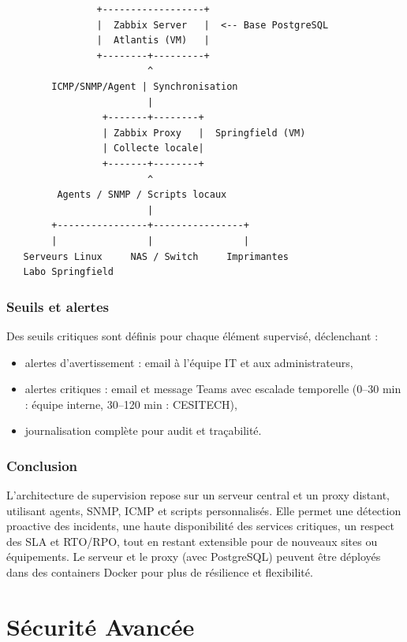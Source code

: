 \vspace{0.5cm}
\begin{center}
\begin{verbatim}
                +------------------+
                |  Zabbix Server   |  <-- Base PostgreSQL
                |  Atlantis (VM)   |
                +--------+---------+
                         ^
        ICMP/SNMP/Agent | Synchronisation
                         |
                 +-------+--------+
                 | Zabbix Proxy   |  Springfield (VM)
                 | Collecte locale|
                 +-------+--------+
                         ^
         Agents / SNMP / Scripts locaux
                         |
        +----------------+----------------+
        |                |                |
   Serveurs Linux     NAS / Switch     Imprimantes
   Labo Springfield
\end{verbatim}
\end{center}

\subsubsection*{Seuils et alertes}
\noindent Des seuils critiques sont définis pour chaque élément supervisé, déclenchant :
\begin{itemize}
    \item alertes d’avertissement : email à l’équipe IT et aux administrateurs,
    \item alertes critiques : email et message Teams avec escalade temporelle (0–30 min : équipe interne, 30–120 min : CESITECH),
    \item journalisation complète pour audit et traçabilité.
\end{itemize}

\subsubsection*{Conclusion}
\noindent L’architecture de supervision repose sur un serveur central et un proxy distant, utilisant agents, SNMP, ICMP et scripts personnalisés. Elle permet une détection proactive des incidents, une haute disponibilité des services critiques, un respect des SLA et RTO/RPO, tout en restant extensible pour de nouveaux sites ou équipements. Le serveur et le proxy (avec PostgreSQL) peuvent être déployés dans des containers Docker pour plus de résilience et flexibilité.

\newpage

\section*{Sécurité Avancée}

